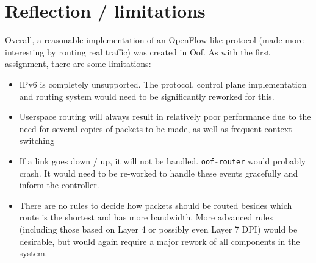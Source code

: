 \documentclass[a4paper]{article}
\numberwithin{figure}{section}
\numberwithin{table}{section}
\newcommand{\mi}{\mintinline}
\begin{document}
\section{Reflection / limitations}
Overall, a reasonable implementation of an OpenFlow-like protocol (made more interesting by routing real traffic) was created in Oof. As with the first assignment, there are some limitations:
\begin{itemize}
	\item IPv6 is completely unsupported. The protocol, control plane implementation and routing system would need to be significantly reworked for this.
	\item Userspace routing will always result in relatively poor performance due to the need for several copies of packets to be made, as well as frequent context switching
	\item If a link goes down / up, it will not be handled. \mi{c}{oof-router} would probably crash. It would need to be re-worked to handle these events gracefully and inform the controller.
	\item There are no rules to decide how packets should be routed besides which route is the shortest and has more bandwidth. More advanced rules (including those based on Layer 4 or possibly even Layer 7 DPI) would be desirable, but would again require a major rework of all components in the system.
\end{itemize}
\end{document}
